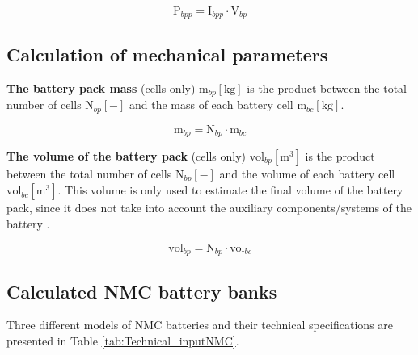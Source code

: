 \begin{equation}\label{eq:Pbpp}
\text{P}_{bpp} = \text{I}_{bpp} \cdot \text{V}_{bp}
\end{equation}

\subsection{Calculation of mechanical parameters}

\textbf{The battery pack mass} (cells only) $\text{m}_{bp} [\text{kg}]$ is the product between the total number of cells $\text{N}_{bp} [-]$ and the mass of each battery cell $\text{m}_{bc} [\text{kg}]$.

\begin{equation}\label{eq:mbp}
\text{m}_{bp} = \text{N}_{bp} \cdot \text{m}_{bc}
\end{equation}

\textbf{The volume of the battery pack} (cells only) $\text{vol}_{bp} [\text{m}^{3}]$ is the product between the total number of cells $\text{N}_{bp} [-]$ and the volume of each battery cell $\text{vol}_{bc} [\text{m}^{3}]$. This volume is only used to estimate the final volume of the battery pack, since it does not take into account the auxiliary components/systems of the battery \cite{x-engineer}.

\begin{equation}\label{eq:volpc}
\text{vol}_{bp} = \text{N}_{bp} \cdot \text{vol}_{bc}
\end{equation}

\subsection{Calculated NMC battery banks}

Three different models of NMC batteries and their technical specifications are presented in Table \ref{tab:Technical_inputNMC}.

